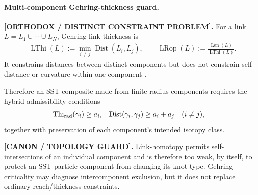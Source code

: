 \documentclass[11pt]{article}
\theoremstyle{definition}
\theoremstyle{plain}
\theoremstyle{remark}
\begin{document}
\paragraph{Multi-component Gehring-thickness guard.}
        \textbf{[ORTHODOX / DISTINCT CONSTRAINT PROBLEM].}
        For a link \(L=L_1\cup\cdots\cup L_N\), Gehring link-thickness is
        \begin{align}
            \operatorname{LThi}(L)
            :=
            \min_{i\neq j}\operatorname{Dist}(L_i,L_j),
            \qquad
            \operatorname{LRop}(L)
            :=
            \frac{\operatorname{Len}(L)}{\operatorname{LThi}(L)}.
            \label{eq:canon_gehring_link_thickness}
        \end{align}
        It constrains distances between distinct components but does not constrain
        self-distance or curvature within one component
        \cite{CantarellaFuKusnerSullivanWrinkle2006Gehring}.

        Therefore an SST composite made from finite-radius components requires the
        hybrid admissibility conditions
        \begin{align}
            \operatorname{Thi}_{\rm rad}(\gamma_i)
            &\geq a_i,
            &
            \operatorname{Dist}(\gamma_i,\gamma_j)
            &\geq a_i+a_j
            \quad(i\neq j),
            \label{eq:canon_hybrid_component_thickness}
        \end{align}
        together with preservation of each component's intended isotopy class.

        \textbf{[CANON / TOPOLOGY GUARD].}
        Link-homotopy permits self-intersections of an individual component and is
        therefore too weak, by itself, to protect an SST particle component from
        changing its knot type.  Gehring criticality may diagnose intercomponent
        exclusion, but it does not replace ordinary reach/thickness constraints.
\end{document}
